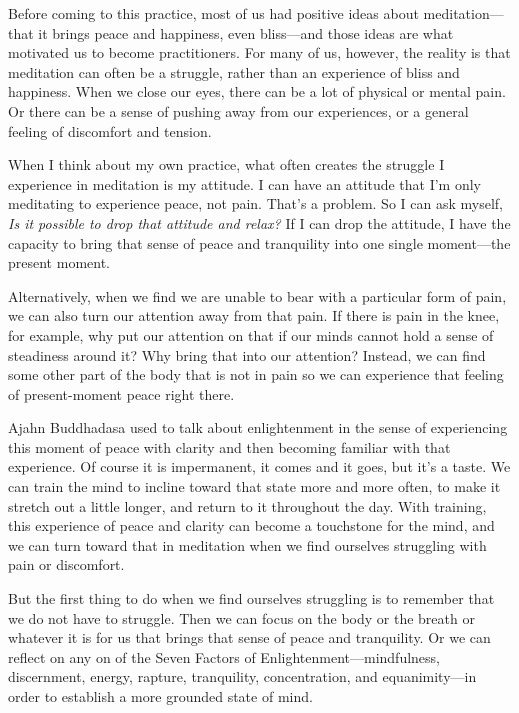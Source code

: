 
Before coming to this practice, most of us had positive ideas about 
meditation---that it brings peace and happiness, even bliss---and those 
ideas are what motivated us to become practitioners. For many of us, 
however, the reality is that meditation can often be a struggle, rather 
than an experience of bliss and happiness. When we close our eyes, 
there can be a lot of physical or mental pain. Or there can be a sense 
of pushing away from our experiences, or a general feeling of 
discomfort and tension.

When I think about my own practice, what often creates the struggle I 
experience in meditation is my attitude. I can have an attitude that 
I'm only meditating to experience peace, not pain. That's a problem. So 
I can ask myself, \emph{Is it possible to drop that attitude and 
relax?} If I can drop the attitude, I have the capacity to bring that 
sense of peace and tranquility into one single moment---the present 
moment.

Alternatively, when we find we are unable to bear with a particular 
form of pain, we can also turn our attention away from that pain. If 
there is pain in the knee, for example, why put our attention on that 
if our minds cannot hold a sense of steadiness around it? Why bring 
that into our attention? Instead, we can find some other part of the 
body that is not in pain so we can experience that feeling of 
present-moment peace right there.

Ajahn Buddhadasa used to talk about enlightenment in the sense of 
experiencing this moment of peace with clarity and then becoming 
familiar with that experience. Of course it is impermanent, it comes 
and it goes, but it's a taste. We can train the mind to incline toward 
that state more and more often, to make it stretch out a little longer, 
and return to it throughout the day. With training, this experience of 
peace and clarity can become a touchstone for the mind, and we can turn 
toward that in meditation when we find ourselves struggling with pain 
or discomfort.

But the first thing to do when we find ourselves struggling is to 
remember that we do not have to struggle. Then we can focus on the body 
or the breath or whatever it is for us that brings that sense of peace 
and tranquility. Or we can reflect on any on of the Seven Factors of 
Enlightenment---mindfulness, discernment, energy, rapture, tranquility, 
concentration, and equanimity---in order to establish a more grounded 
state of mind.

